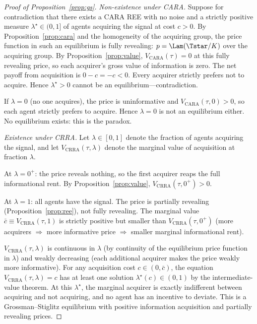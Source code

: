 \begin{proof}[Proof of Proposition~\ref{prop:gs}]
\emph{Non-existence under CARA.} Suppose for contradiction that there
exists a CARA REE with no noise and a strictly positive measure
$\lambda^{\star}\in(0,1]$ of agents acquiring the signal at cost $c>0$.
By Proposition~\ref{prop:cara} and the homogeneity of the acquiring
group, the price function in such an equilibrium is fully revealing:
$p=\Lam(\Tstar/K)$ over the acquiring group. By
Proposition~\ref{prop:value}, $V_{\mathrm{CARA}}(\tau)=0$ at this fully
revealing price, so each acquirer's gross value of information is zero.
The net payoff from acquisition is $0-c=-c<0$. Every acquirer strictly
prefers not to acquire. Hence $\lambda^{\star}>0$ cannot be an
equilibrium---contradiction.

If $\lambda=0$ (no one acquires), the price is uninformative and
$V_{\mathrm{CARA}}(\tau,0)>0$, so each agent strictly prefers to acquire.
Hence $\lambda=0$ is not an equilibrium either. No equilibrium exists:
this is the \citet{GS1980} paradox.

\emph{Existence under CRRA.} Let $\lambda\in[0,1]$ denote the fraction of
agents acquiring the signal, and let $V_{\mathrm{CRRA}}(\tau,\lambda)$
denote the marginal value of acquisition at fraction $\lambda$.

At $\lambda=0^{+}$: the price reveals nothing, so the first acquirer
reaps the full informational rent. By Proposition~\ref{prop:value},
$V_{\mathrm{CRRA}}(\tau,0^{+})>0$.

At $\lambda=1$: all agents have the signal. The price is partially
revealing (Proposition~\ref{prop:ree}), not fully revealing. The
marginal value $\bar c\equiv V_{\mathrm{CRRA}}(\tau,1)$ is strictly
positive but smaller than $V_{\mathrm{CRRA}}(\tau,0^{+})$ (more
acquirers $\Rightarrow$ more informative price $\Rightarrow$ smaller
marginal informational rent).

$V_{\mathrm{CRRA}}(\tau,\lambda)$ is continuous in $\lambda$ (by
continuity of the equilibrium price function in $\lambda$) and weakly
decreasing (each additional acquirer makes the price weakly more
informative). For any acquisition cost $c\in(0,\bar c)$, the equation
$V_{\mathrm{CRRA}}(\tau,\lambda)=c$ has at least one solution
$\lambda^{\star}(c)\in(0,1)$ by the intermediate-value theorem. At this
$\lambda^{\star}$, the marginal acquirer is exactly indifferent between
acquiring and not acquiring, and no agent has an incentive to deviate.
This is a Grossman--Stiglitz equilibrium with positive information
acquisition and partially revealing prices.
\end{proof}

